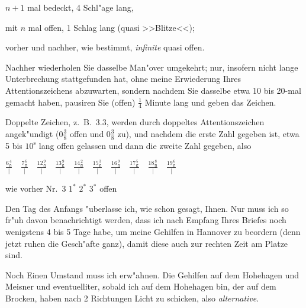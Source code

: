 \documentclass[12pt,a4paper]{article}
\theoremstyle{plain}
\theoremstyle{definition}
\theoremstyle{remark}
\begin{document}
$n+1$ mal bedeckt, 4 Schl"age lang,

mit $n$ mal offen, 1 Schlag lang (quasi >>Blitze<<);

vorher und nachher, wie bestimmt, \emph{infinite} quasi offen.

Nachher wiederholen Sie dasselbe Man"over umgekehrt; nur, insofern nicht lange Unterbrechung stattgefunden hat, ohne meine Erwiederung Ihres Attentionszeichens abzuwarten, sondern nachdem Sie dasselbe etwa 10 bis 20-mal gemacht haben, pausiren Sie (offen) $\frac{1}{4}$ Minute lang und geben das Zeichen.

Doppelte Zeichen, z.~B.\ 3.3, werden durch doppeltes Attentionszeichen angek"undigt ($0\frac{3}{8}$ offen und $0\frac{3}{8}$ zu), und nachdem die erste Zahl gegeben ist, etwa 5 bis $10^{\mathrm{s}}$ lang offen gelassen und dann die zweite Zahl gegeben, also
\begin{center}
$\displaystyle \frac{6\frac{4}{0}}{|} \quad \frac{7\frac{6}{0}}{|} \quad \frac{12\frac{9}{0}}{|} \quad \frac{13\frac{9}{6}}{|} \quad \frac{14\frac{2}{0}}{|} \quad \frac{15\frac{3}{6}}{|} \quad \frac{16\frac{9}{0}}{|} \quad \frac{17\frac{5}{6}}{|} \quad \frac{18\frac{8}{0}}{|} \quad \frac{19\frac{6}{0}}{|}$
\end{center}
wie vorher Nr.~3 \quad $1^{*}$ \quad $2^{*}$ \quad $3^{*}$ \quad offen

\newpage
\noindent Den Tag des Anfangs "uberlasse ich, wie schon gesagt, Ihnen. Nur muss ich so fr"uh davon benachrichtigt werden, dass ich nach Empfang Ihres Briefes noch wenigstens 4 bis 5 Tage habe, um meine Gehilfen in Hannover zu beordern (denn jetzt ruhen die Gesch"afte ganz), damit diese auch zur rechten Zeit am Platze sind.

Noch Einen Umstand muss ich erw"ahnen. Die Gehilfen auf dem Hohehagen und Meisner und eventuelliter, sobald ich auf dem Hohehagen bin, der auf dem Brocken, haben nach 2 Richtungen Licht zu schicken, also \emph{alternative}.
\end{document}
